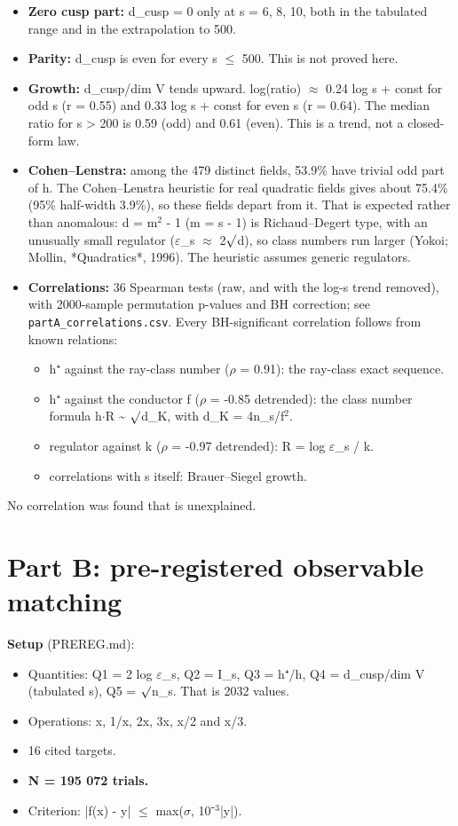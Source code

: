 \documentclass[10pt]{article}\usepackage[margin=0.8in]{geometry}\usepackage{amssymb,longtable,array,url,hyperref}\usepackage[T1]{fontenc}\usepackage{lmodern}\sloppy\usepackage{newunicodechar}\newunicodechar{η}{\ensuremath{\eta}}\newunicodechar{ω}{\ensuremath{\omega}}\newunicodechar{⁺}{\ensuremath{^{+}}}\newunicodechar{⁻}{\ensuremath{^{-}}}\newunicodechar{∏}{\ensuremath{\prod}}\newunicodechar{⁸}{\ensuremath{^{8}}}\newunicodechar{⁴}{\ensuremath{^{4}}}\newunicodechar{⁶}{\ensuremath{^{6}}}\newunicodechar{θ}{\ensuremath{\theta}}\newunicodechar{₇}{\ensuremath{_{7}}}\newunicodechar{₂}{\ensuremath{_{2}}}\newunicodechar{₁}{\ensuremath{_{1}}}\newunicodechar{⊕}{\ensuremath{\oplus}}
\begin{document}
\begin{itemize}
\item  \textbf{Zero cusp part:} d\_cusp = 0 only at s = 6, 8, 10, both in the tabulated range and in the extrapolation to 500.
\item  \textbf{Parity:} d\_cusp is even for every s $\leq$ 500. This is not proved here.
\item  \textbf{Growth:} d\_cusp/dim V tends upward. log(ratio) $\approx$ 0.24 log s + const for odd s (r = 0.55) and 0.33 log s + const for even s (r = 0.64). The median ratio for s > 200 is 0.59 (odd) and 0.61 (even). This is a trend, not a closed-form law.
\item  \textbf{Cohen--Lenstra:} among the 479 distinct fields, 53.9\% have trivial odd part of h. The Cohen--Lenstra heuristic for real quadratic fields gives about 75.4\% (95\% half-width 3.9\%), so these fields depart from it. That is expected rather than anomalous: d = m$^2$ - 1 (m = s - 1) is Richaud--Degert type, with an unusually small regulator ($\varepsilon$\_s $\approx$ 2$\surd$d), so class numbers run larger (Yokoi; Mollin, *Quadratics*, 1996). The heuristic assumes generic regulators.
\item  \textbf{Correlations:} 36 Spearman tests (raw, and with the log-s trend removed), with 2000-sample permutation p-values and BH correction; see \texttt{partA\_correlations.csv}. Every BH-significant correlation follows from known relations:
\begin{itemize}
\item  h⁺ against the ray-class number ($\rho$ = 0.91): the ray-class exact sequence.
\item  h⁺ against the conductor f ($\rho$ = -0.85 detrended): the class number formula h$\cdot$R \~{} $\surd$d\_K, with d\_K = 4n\_s/f$^2$.
\item  regulator against k ($\rho$ = -0.97 detrended): R = log $\varepsilon$\_s / k.
\item  correlations with s itself: Brauer--Siegel growth.
\end{itemize}
\end{itemize}

  No correlation was found that is unexplained.

\section*{Part B: pre-registered observable matching}

\textbf{Setup} (PREREG.md):
\begin{itemize}
\item  Quantities: Q1 = 2 log $\varepsilon$\_s, Q2 = I\_s, Q3 = h⁺/h, Q4 = d\_cusp/dim V (tabulated s), Q5 = $\surd$n\_s. That is 2032 values.
\item  Operations: x, 1/x, 2x, 3x, x/2 and x/3.
\item  16 cited targets.
\item  \textbf{N = 195 072 trials.}
\item  Criterion: |f(x) - y| $\leq$ max($\sigma$, 10⁻$^3$|y|).
\end{itemize}
\end{document}
